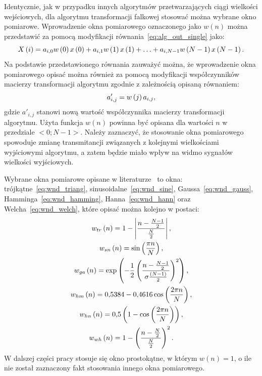 Identycznie, jak w przypadku innych algorytmów przetwarzających ciągi wielkości wejściowych, dla algorytmu transformacji falkowej stosować można wybrane okno pomiarowe. Wprowadzenie okna pomiarowego oznaczonego jako $w(n)$ można przedstawić za pomocą modyfikacji równania~\eqref{eq:alg_out_single} jako:
\begin{equation}
X \left(i\right) = a_{i, 0} w \left(0\right) x \left(0\right) + a_{i, 1} w \left(1\right) x \left(1\right) + \hdots + a_{i, N-1} w \left(N-1\right) x \left(N-1\right) \label{eq:wt_singlewindow}.
\end{equation}
Na podstawie przedstawionego równania zauważyć można, że wprowadzenie okna pomiarowego opisać można również za pomocą modyfikacji współczynników macierzy transformacji algorytmu zgodnie z zależnością opisaną równaniem:
\begin{equation}
a'_{i,j} = w \left(j\right) a_{i,j} \label{eq:wt_windowmod},
\end{equation}
gdzie $a'_{i,j}$ stanowi nową wartość współczynnika macierzy transformacji algorytmu. Użyta funkcja $w(n)$ powinna być opisana dla wartości $n$ w przedziale $<0;N-1>$. Należy zaznaczyć, że stosowanie okna pomiarowego spowoduje zmianę transmitancji związanych z kolejnymi wielkościami wyjściowymi algorytmu, a zatem będzie miało wpływ na widmo sygnałów wielkości wyjściowych.

Wybrane okna pomiarowe opisane w literaturze~\cite{oppenheim_dsp, oppenheim_sns, proakis_dsp} to okna: trójkątne~\eqref{eq:wnd_triang}, sinusoidalne~\eqref{eq:wnd_sine}, Gaussa~\eqref{eq:wnd_gauss}, Hamminga~\eqref{eq:wnd_hamming}, Hanna~\eqref{eq:wnd_hann} oraz Welcha~\eqref{eq:wnd_welch}, które opisać można kolejno w postaci:
\begin{gather}
w_{tr} \left(n\right) = 1 - \left| \frac{n - \frac{N-1}{2}}{\frac{N}{2}} \right| \label{eq:wnd_triang}, \\
w_{sn} \left(n\right) = \sin \left( \frac{\pi n}{N} \right) \label{eq:wnd_sine}, \\
w_{ga} \left(n\right) = \exp \left(-\frac{1}{2} \left( \frac{n - \frac{N-1}{2}}{\sigma \frac{\left(N-1\right)}{2}} \right)^{2} \right) \label{eq:wnd_gauss}, \\
w_{hm} \left(n\right) = \num{0.5384} - \num{0.4616} \cos \left( \frac{2 \pi n}{N} \right) \label{eq:wnd_hamming}, \\
w_{hn} \left(n\right) = \num{0.5} \left(1 - \cos \left( \frac{2 \pi n}{N} \right) \right) \label{eq:wnd_hann}, \\
w_{wh} \left(n\right) = 1 - \left( \frac{n - \frac{N}{2}}{\frac{N}{2}} \right)^{2} \label{eq:wnd_welch}.
\end{gather}
W dalszej części pracy stosuje się okno prostokątne, w którym $w(n) = 1$, o ile nie został zaznaczony fakt stosowania innego okna pomiarowego.

